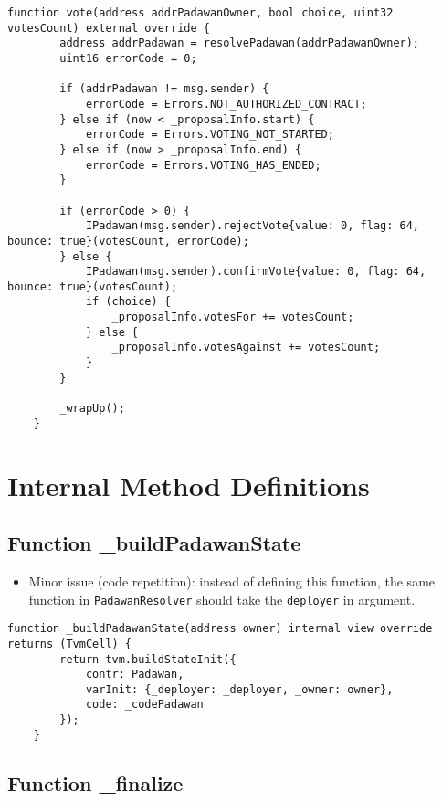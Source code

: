 \begin{lstlisting}[firstnumber=55]
    function vote(address addrPadawanOwner, bool choice, uint32 votesCount) external override {
        address addrPadawan = resolvePadawan(addrPadawanOwner);
        uint16 errorCode = 0;

        if (addrPadawan != msg.sender) {
            errorCode = Errors.NOT_AUTHORIZED_CONTRACT;
        } else if (now < _proposalInfo.start) {
            errorCode = Errors.VOTING_NOT_STARTED;
        } else if (now > _proposalInfo.end) {
            errorCode = Errors.VOTING_HAS_ENDED;
        }

        if (errorCode > 0) {
            IPadawan(msg.sender).rejectVote{value: 0, flag: 64, bounce: true}(votesCount, errorCode);
        } else {
            IPadawan(msg.sender).confirmVote{value: 0, flag: 64, bounce: true}(votesCount);
            if (choice) {
                _proposalInfo.votesFor += votesCount;
            } else {
                _proposalInfo.votesAgainst += votesCount;
            }
        }

        _wrapUp();
    }
\end{lstlisting}

\section{Internal Method Definitions}


\subsection{Function \_{}buildPadawanState}

\begin{itemize}
\item Minor issue (code repetition): instead of defining this
  function, the same function in {\tt PadawanResolver} should take the
  {\tt deployer} in argument.
\end{itemize}

\begin{lstlisting}[firstnumber=154]
    function _buildPadawanState(address owner) internal view override returns (TvmCell) {
        return tvm.buildStateInit({
            contr: Padawan,
            varInit: {_deployer: _deployer, _owner: owner},
            code: _codePadawan
        });
    }
\end{lstlisting}

\subsection{Function \_{}finalize}

